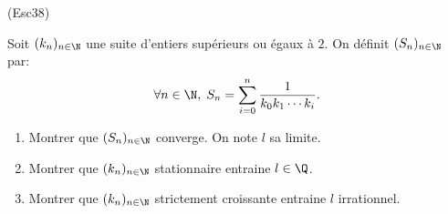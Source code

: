\begin{tiny}(Esc38)\end{tiny} Soit $(k_n)_{n\in \N}$ une suite d'entiers supérieurs ou égaux à $2$. On définit $(S_n)_{n\in \N}$ par:
\[
  \forall n \in \N, \; S_n = \sum_{i=0}^n \frac{1}{k_0 k_1 \cdots k_i}.
\]
\begin{enumerate}
  \item Montrer que $(S_n)_{n\in \N}$ converge. On note $l$ sa limite.
  \item Montrer que $(k_n)_{n\in \N}$ stationnaire entraine $l \in \Q$.
  \item Montrer que $(k_n)_{n\in \N}$ strictement croissante entraine $l$ irrationnel.
\end{enumerate}
